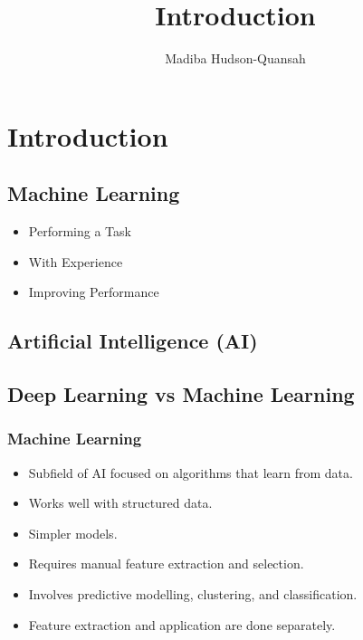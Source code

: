 \documentclass[12pt letter]{report}
\title{\Huge{Introduction}}
\author{\huge{Madiba Hudson-Quansah}}
\date{}
\begin{document}
\maketitle
\newpage
{}
\tableofcontents
\pagebreak

\chapter{Introduction}

\section{Machine Learning}

\begin{itemize}
  \item Performing a Task
  \item With Experience
  \item Improving Performance
\end{itemize}

\section{Artificial Intelligence (AI)}



\section{Deep Learning vs Machine Learning}

\subsection{Machine Learning}
\begin{itemize}
  \item Subfield of AI focused on algorithms that learn from data.
  \item Works well with structured data.
  \item Simpler models.
  \item Requires manual feature extraction and selection.
  \item Involves predictive modelling, clustering, and classification.
  \item Feature extraction and application are done separately.
\end{itemize}
\end{document}
